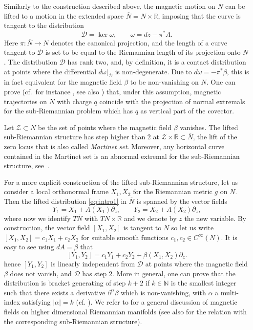 \documentclass{amsart}
\theoremstyle{plain}
\theoremstyle{definition}
\theoremstyle{remark}
\newcommand{\R}{\mathbb{R}}
\newcommand{\sr}{sub-{R}ie\-man\-nian }
\newcommand{\distr}{\mathcal{D}}								%
\newcommand{\B}{\beta}
\newcommand{\lift}[1]{\overline{#1}} 							%
\begin{document}
 Similarly to the construction described above, the magnetic motion on $N$ can be lifted to a motion in the extended space $\overline N=N\times \R$, imposing that the curve is tangent to the distribution
 \begin{equation} \label{eq:intro1}
	\distr=\ker \omega,\qquad \omega=dz-\pi^{*}A.
 \end{equation}
Here $\pi:\overline N \to N$ denotes the canonical projection, and the length of a curve tangent to $\distr$ is set to be equal to the Riemannian length of its projection onto $N$.
The distribution $\distr$ has rank two, and, by definition, it is a contact distribution at points where 
 the differential 
$d\omega|_{\distr}$ 
 is non-degenerate. 
Due to $d\omega=-\pi^{*}\beta$, this is in fact equivalent for the magnetic field $\B$ to be non-vanishing on $N$. 
One can prove (cf.\ for instance \cite{AG99}, see also \cite[Sec.\ 4.4]{thebook}) that, under this assumption, magnetic trajectories on $N$ with charge $q$ coincide with the projection of normal extremals for the \sr problem  which has $q$ as vertical part of the covector.



 Let $\mathcal{Z}\subset N$ be the set of points where the magnetic field $\B$ vanishes. The lifted \sr structure has step higher than 2 at $\mathcal{Z}\times \R\subset \lift N$,
 the lift of the zero locus that is also called \emph{Martinet set}. 
Moreover, any horizontal curve contained in the Martinet set is an abnormal extremal for the \sr structure, see~\cite[Lemma~4.43]{thebook}. 

For a more explicit construction of the lifted \sr structure, let us consider a local orthonormal frame $X_{1},X_{2}$ for the Riemannian metric $g$ on $N$. Then the lifted distribution \eqref{eq:intro1} in $\lift N$ is spanned by the vector fields
\begin{equation}
Y_{1}=X_{1}+ A(X_{1})\partial_z,\qquad Y_{2}=X_{2}+ A(X_{2})\partial_z,
\end{equation}
where now we identify $T\lift N$ with $TN\times \R$ and we denote by $z$ the new variable. By construction, the vector field $[X_{1},X_{2}]$ is tangent to $N$ so let us write $[X_{1},X_{2}]=c_{1}X_{1}+c_{2}X_{2}$ for suitable smooth functions $c_{1},c_{2}\in C^{\infty}(N)$. It is easy to see using  $dA=\beta$ that
 $$[Y_{1},Y_{2}]=c_{1}Y_{1}+c_{2}Y_{2}+\beta(X_{1},X_{2})\partial_{z}.$$
hence $[Y_{1},Y_{2}]$ is linearly independent from $\distr$ at points where the magnetic field $\beta$ does not vanish, and $\distr$ has step 2. More in general, one can prove that the distribution is bracket generating of step $k+2$ if $k\in \mathbb N$ is the smallest integer such that there exists a derivative $\partial^{\alpha}\beta$ which is non-vanishing, with $\alpha$ a multi-index satisfying $|\alpha|=k$ (cf. \cite[Exercise~4.44]{thebook}). We refer to \cite[Chapter~12]{MonBook} for a general discussion of magnetic fields on higher dimensional Riemannian manifolds (see also \cite{LZ11} for the relation with the corresponding sub-Riemannian structure).
\end{document}
